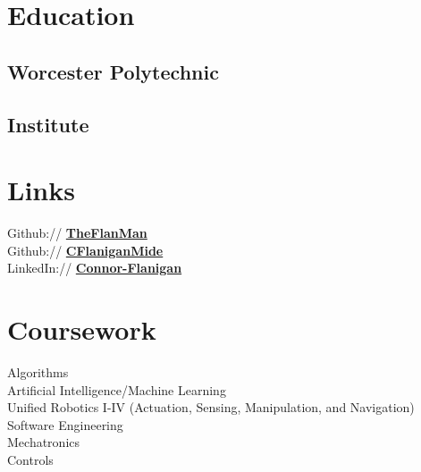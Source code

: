 \documentclass[letterpaper]{deedy-resume} %
\begin{document}
\begin{minipage}[t]{0.33\textwidth} %


\section{Education} 

\subsection{Worcester Polytechnic}
\subsection{Institute}


\sectionspace %


\section{Links} 

Github:// \href{https://github.com/theflanman}{\bf TheFlanMan} \\
Github:// \href{https://github.com/CFlaniganMide}{\bf CFlaniganMide} \\
LinkedIn:// \href{https://www.linkedin.com/in/connor-flanigan}{\bf Connor-Flanigan}

\sectionspace %


\section{Coursework}

Algorithms \\
Artificial Intelligence/Machine Learning \\
Unified Robotics I-IV (Actuation, Sensing, Manipulation, and Navigation) \\
Software Engineering \\
Mechatronics \\ 
Controls


\end{minipage}
\end{document}
